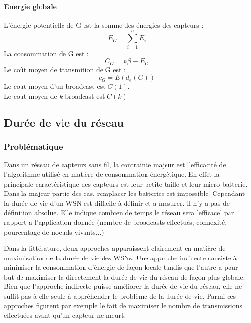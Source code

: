 \paragraph{Energie globale}
\begin{mydef}
 L'énergie potentielle de G est la somme des énergies des capteurs :$$E_G=\sum_{i=1}^n{E_i}$$
 La consommation de  G est :$$C_G=n\beta - E_G$$
 Le coût moyen de transmition de  G est :$$c_G=E(d_e(G))$$
 Le cout moyen d'un broadcast est $C(1)$.\\
 Le cout moyen de $k$ broadcast est $C(k)$


\end{mydef}



\subsection{Durée de vie du réseau}
\subsubsection{Problématique}


Dans un réseau de capteurs sans fil, la contrainte majeur est l'efficacité de l'algorithme utilisé en matière de consommation énergétique. En effet la principale caractéristique des capteurs
est leur petite taille et leur micro-batterie. Dans la majeur partie des cas, remplacer les batteries est impossible. Cependant la durée de vie d'un WSN est difficile à définir et a mesurer.
Il n'y a pas de définition absolue. Elle indique combien de temps le réseau sera 'efficace' par rapport a l'application donnée (nombre de broadcasts effectués, connexité, pourcentage de noeuds vivants...).

Dans la littérature, deux approches apparaissent clairement en matière de maximisation de la durée de vie des WSNs. Une approche indirecte consiste à minimiser la consommation d'énergie de façon locale tandis que l'autre a pour but 
de maximiser la directement la durée de vie du réseau de façon plus globale. Bien que l'approche indirecte puisse améliorer la durée de vie du réseau, elle ne suffit pas à elle seule à appréhender le problème de la durée de vie.
Parmi ces approches figurent  par exemple le fait de maximiser le nombre de transmissions effectuées avant qu'un capteur ne meurt.

